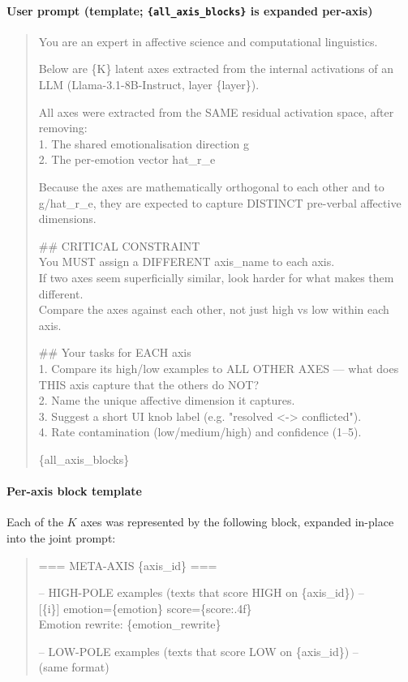 \paragraph{User prompt (template; \texttt{\{all\_axis\_blocks\}} is expanded per-axis)}
\begin{quote}
\small\ttfamily
You are an expert in affective science and computational linguistics.
\par\medskip
Below are \{K\} latent axes extracted from the internal activations of an LLM
(Llama-3.1-8B-Instruct, layer \{layer\}).
\par
All axes were extracted from the SAME residual activation space, after removing:\\
1. The shared emotionalisation direction g\\
2. The per-emotion vector hat\_r\_e
\par
Because the axes are mathematically orthogonal to each other and to g/hat\_r\_e, they
are expected to capture DISTINCT pre-verbal affective dimensions.
\par\medskip
\#\# CRITICAL CONSTRAINT\\
You MUST assign a DIFFERENT axis\_name to each axis.\\
If two axes seem superficially similar, look harder for what makes them different.\\
Compare the axes against each other, not just high vs low within each axis.
\par\medskip
\#\# Your tasks for EACH axis\\
1. Compare its high/low examples to ALL OTHER AXES --- what does THIS axis capture
that the others do NOT?\\
2. Name the unique affective dimension it captures.\\
3. Suggest a short UI knob label (e.g. "resolved <-> conflicted").\\
4. Rate contamination (low/medium/high) and confidence (1--5).
\par\medskip
\{all\_axis\_blocks\}
\end{quote}

\paragraph{Per-axis block template}

Each of the $K$ axes was represented by the following block, expanded in-place into the
joint prompt:
\begin{quote}
\small\ttfamily
=== META-AXIS \{axis\_id\} ===
\par
-- HIGH-POLE examples (texts that score HIGH on \{axis\_id\}) --\\
{[}\{i\}{]} emotion=\{emotion\}  score=\{score:.4f\}\\
\phantom{x}Emotion rewrite: \{emotion\_rewrite\}
\par
-- LOW-POLE examples (texts that score LOW on \{axis\_id\}) --\\
(same format)
\end{quote}

